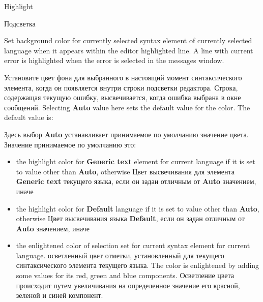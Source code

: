 \begin{popup}
\ifenglish
\caption{Highlight}
\else
\caption{Подсветка}
\fi
{}

\ifenglish
Set background color for currently selected syntax element of currently selected
language when it appears within the editor highlighted line.
A line with current error is highlighted when the error is selected in the
messages window.

\else
Установите цвет фона для выбранного в настоящий момент синтаксического элемента,
когда он появляется внутри строки подсветки редактора.
Строка, содержащая текущую ошибку, высвечивается, когда ошибка выбрана в окне
сообщений.
\fi
\ifenglish
Selecting {\bf Auto} value here sets the default value for the color. The default
value is:

\else
Здесь выбор {\bf Auto} устанавливает принимаемое по умолчанию значение цвета.
Значение принимаемое по умолчанию это:
\fi
\begin{itemize}
\item 
 \ifenglish
 the highlight color for {\bf Generic text} element for current language
 if it is set  to value other than {\bf Auto}, otherwise
 \else
 Цвет высвечивания для элемента {\bf Generic text} текущего языка, если он
 задан отличным от {\bf Auto} значением, иначе
 \fi
\item 
 \ifenglish
 the highlight color for {\bf Default} language
 if it is set  to value other than {\bf Auto}, otherwise
 \else
 Цвет высвечивания языка {\bf Default}, если он
 задан отличным от {\bf Auto} значением, иначе
 \fi
\item 
 \ifenglish
 the enlightened color of selection set for current syntax element for
current language.
 \else
 осветленный цвет отметки, установленный для текущего синтаксического
 элемента текущего языка.
  \fi
 \ifenglish
The color is enlightened by adding some values for its red,
green and blue components.
 \else
 Осветление цвета происходит путем увеличивания на определенное значение
 его красной, зеленой и синей компонент.
 \fi
\end{itemize}
\end{popup}

